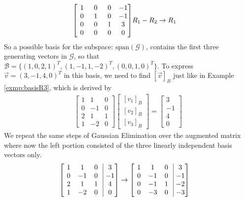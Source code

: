 \begin{solution}
\begin{align*}
\left[\begin{array}{@{\,}wc{10pt}wc{10pt}wc{10pt}wc{10pt}@{\,}}
1 & 0 & 0 & -1\\
0 & 1 & 0 & -1\\
0 & 0 & 1 & 3\\
0 & 0 & 0 & 0 
\end{array}
\right] & 
R_1 - R_2 \to R_1
\end{align*}
So a possible basis for the subspace: $\text{span}(\mathcal{G})$, contains the first three generating vectors in $\mathcal{G}$, so that $\mathcal{B} = \{(1,0,2,1)^T, (1,-1,1,-2)^T, (0,0,1,0)^T\}$. To express $\vec{v} = (3,-1,4,0)^T$ in this basis, we need to find $[\vec{v}]_B$ just like in Example \ref{exmp:basisR3}, which is derived by
\begin{align*}
\begin{bmatrix}
1 & 1 & 0 \\
0 & -1 & 0 \\
2 & 1 & 1 \\
1 & -2 & 0
\end{bmatrix}
\begin{bmatrix}
[v_1]_B \\
[v_2]_B \\
[v_3]_B
\end{bmatrix} =
\begin{bmatrix}
3 \\
-1 \\
4 \\
0
\end{bmatrix}
\end{align*}
We repeat the same steps of Gaussian Elimination over the augmented matrix where now the left portion consisted of the three linearly independent basis vectors only.
\begin{align*}
\left[\begin{array}{@{\,}wc{10pt}wc{10pt}wc{10pt}|wc{10pt}@{\,}}
1 & 1 & 0 & 3\\
0 & -1 & 0 & -1\\
2 & 1 & 1 & 4\\
1 & -2 & 0 & 0 
\end{array}\right] &\to
\left[\begin{array}{@{\,}wc{10pt}wc{10pt}wc{10pt}|wc{10pt}@{\,}}
1 & 1 & 0 & 3 \\
0 & -1 & 0 & -1\\
0 & -1 & 1 & -2\\
0 & -3 & 0 & -3 
\end{array}\right]
& \begin{aligned}

\end{aligned}
\end{align*}
\end{solution}
